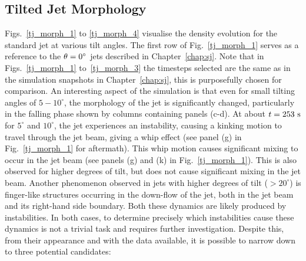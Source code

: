 \subsection{Tilted Jet Morphology}
\label{subsec:steady}
Figs.~\ref{tj_morph_1} to \ref{tj_morph_4} visualise the density evolution for the standard jet at various tilt angles. The first row of Fig.~\ref{tj_morph_1} serves as a reference to the $\theta=0^{\circ}$ jets described in Chapter~\ref{chap:sj}. Note that in Figs.~\ref{tj_morph_1} to~\ref{tj_morph_3} the timesteps selected are the same as in the simulation snapshots in Chapter~\ref{chap:sj}, this is purposefully chosen for comparison. \np
%
An interesting aspect of the simulation is that even for small tilting angles of $5-10^{\circ}$, the morphology of the jet is significantly changed, particularly in the falling phase shown by columns containing panels (c-d). At about $t=253~\rm{s}$ for $5^{\circ}$ and $10^{\circ}$, the jet experiences an instability, causing a kinking motion to travel through the jet beam, giving a whip effect (see panel (g) in Fig.~\ref{tj_morph_1} for aftermath). This whip motion causes significant mixing to occur in the jet beam (see panels (g) and (k) in Fig.~\ref{tj_morph_1}). This is also observed for higher degrees of tilt, but does not cause significant mixing in the jet beam. Another phenomenon observed in jets with higher degrees of tilt ($>20^{\circ}$) is finger-like structures occurring in the down-flow of the jet, both in the jet beam and its right-hand side boundary. Both these dynamics are likely produced by instabilities. In both cases, to determine precisely which instabilities cause these dynamics is not a trivial task and requires further investigation. Despite this, from their appearance and with the data available, it is possible to narrow down to three potential candidates:
